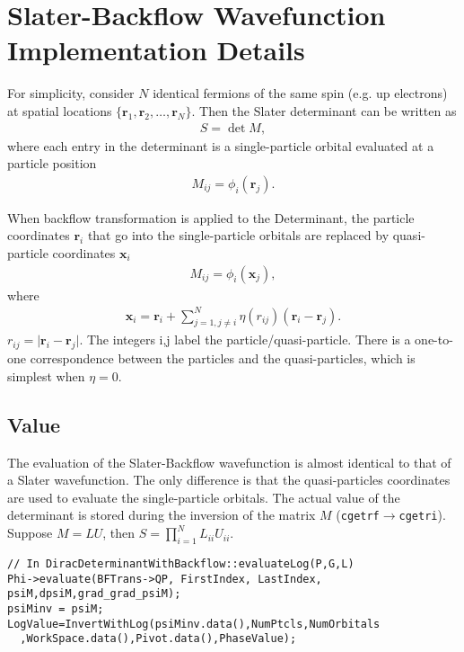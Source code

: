 \newcommand{\bs}{\boldsymbol}
\newcommand{\tr}{\text{tr}}
\section{Slater-Backflow Wavefunction Implementation Details}

For simplicity, consider $N$ identical fermions of the same spin (e.g. up electrons) at spatial locations $\{\bs{r}_1,\bs{r}_2,\dots,\bs{r}_{N}\}$. Then the Slater determinant can be written as
\begin{align}
S=\det M,
\end{align}
where each entry in the determinant is a single-particle orbital evaluated at a particle position
\begin{align}
M_{ij} = \phi_i(\bs{r}_j).
\end{align}

When backflow transformation is applied to the Determinant, the particle coordinates $\bs{r}_i$ that go into the single-particle orbitals are replaced by quasi-particle coordinates $\bs{x}_i$
\begin{align}
M_{ij} = \phi_i(\bs{x}_j), \label{eq:psiM}
\end{align}
where
\begin{align}
\bs{x}_i=\bs{r}_i+\sum\limits_{j=1,j\neq i}^N\eta(r_{ij})(\bs{r}_i-\bs{r}_j). \label{eq:quasi}
\end{align}
$r_{ij}=\vert\bs{r}_i-\bs{r}_j\vert$. The integers i,j label the particle/quasi-particle. There is a one-to-one correspondence between the particles and the quasi-particles, which is simplest when $\eta=0$.

\subsection{Value}
The evaluation of the Slater-Backflow wavefunction is almost identical to that of a Slater wavefunction. The only difference is that the quasi-particles coordinates are used to evaluate the single-particle orbitals. The actual value of the determinant is stored during the inversion of the matrix $M$ (\verb|cgetrf|$\rightarrow$\verb|cgetri|). Suppose $M=LU$, then $S=\prod\limits_{i=1}^N L_{ii} U_{ii}$. \\

\begin{lstlisting}
// In DiracDeterminantWithBackflow::evaluateLog(P,G,L)
Phi->evaluate(BFTrans->QP, FirstIndex, LastIndex, psiM,dpsiM,grad_grad_psiM);
psiMinv = psiM;
LogValue=InvertWithLog(psiMinv.data(),NumPtcls,NumOrbitals
  ,WorkSpace.data(),Pivot.data(),PhaseValue);
\end{lstlisting}


